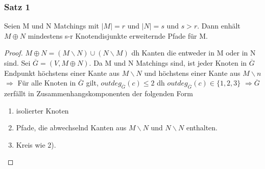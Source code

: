 \subsubsection{Satz 1} Seien M und N Matchings mit $ |M| = r $ und $ |N| = s $ und $  s > r $. Dann enhält $ M \oplus N  $ mindestens s-r Knotendisjunkte erweiternde Pfade für M.

\begin{proof}

$ M \oplus N = (M\backslash N ) \cup (N \backslash M) $ dh Kanten die entweder in M oder in N sind. Sei $ \overline{G} = (V, M \oplus N) $. Da M und N Matchings sind, ist jeder Knoten in $ \overline{G}$ Endpunkt höchstens einer Kante aus $ M \backslash N $ und höchstens einer Kante aus $ M \backslash n $ $ \Rightarrow $ Für alle Knoten in $ \overline{G} $ gilt, $ outdeg_{\overline{G}}(c) \leq 2 $ dh $ outdeg_{\overline{G}}(c) \in \{1, 2, 3\} $ $ \Rightarrow  \overline{G}$ zerfällt in Zusammenhangskomponenten der folgenden Form
\begin{enumerate}
    \item isolierter Knoten
    \item Pfade, die abwechselnd Kanten aus $ M \backslash N $ und $ N \backslash N  $ enthalten.
    \item Kreis wie 2). 
\end{enumerate} 

\end{proof}













 
